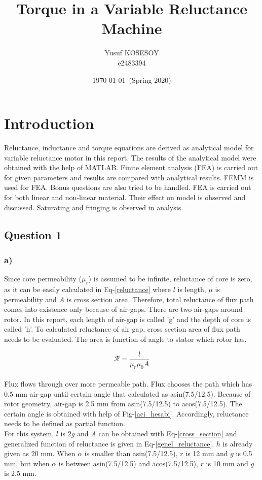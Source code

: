 \documentclass[11pt, a4paper]{article}
\title{Torque in a Variable Reluctance Machine}
\author{Yusuf \textsc{KOSESOY}\\ e2483394}
\date{\today~(Spring 2020)}
\begin{document}


\section*{Introduction}

Reluctance, inductance and torque equations are derived as analytical model for variable reluctance motor in this report. The results of the analytical model were obtained with the help of MATLAB. Finite element analysis (FEA) is carried out for given parameters and results are compared with analytical results. FEMM is used for FEA. Bonus questions are also tried to be handled.
FEA is carried out for both linear and non-linear material. Their effect on model is observed and discussed. Saturating and fringing is observed in analysis.



\subsection*{Question 1}
\subsubsection*{a)}

Since core permeability ($\mu_r$) is assumed to be infinite, reluctance of core is zero, as it can be easily calculated in Eq-\ref{reluctance} where $l$ is length, $\mu$ is permeability and $A$ is cross section area. Therefore, total reluctance of flux path comes into existence only because of air-gaps. There are two air-gaps around rotor. In this report, each length of air-gap is called 'g' and the depth of core is called 'h'. To calculated reluctance of air gap, cross section area of flux path needs to be evaluated. The area is function of angle to stator which rotor has.

\begin{equation}
\label{reluctance}
\mathcal{R}=\frac{l}{\mu_r  \mu_0  A}
\end{equation} \\
Flux flows through over more permeable path. Flux chooses the path which has 0.5 mm air-gap until certain angle that calculated as asin(7.5/12.5). Because of rotor geometry, air-gap is 2.5 mm from asin(7.5/12.5) to acos(7.5/12.5). The certain angle is obtained with help of Fig-\ref{aci_hesabi}. Accordingly, reluctance needs to be defined as partial function.\\

For this system, $l$ is $2g$ and $A$ can be obtained with Eq-\ref{cross_section} and generalized function of reluctance is given in Eq-\ref{genel_reluctance}. $h$ is already given as 20 mm. When $\alpha$ is  smaller than  asin(7.5/12.5), $r$ is 12 mm and $g$ is 0.5 mm, but when $\alpha$ is between asin(7.5/12.5) and acos(7.5/12.5), $r$ is 10 mm and $g$ is 2.5 mm.\\
\end{document}
